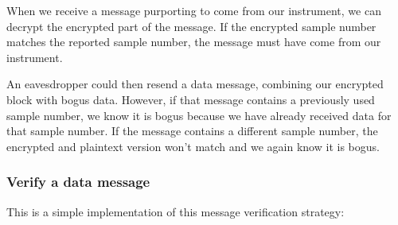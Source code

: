 When we receive a message purporting to come from our instrument, we can decrypt the encrypted part of the message.
If the encrypted sample number matches the reported sample number, the message must have come from our instrument.

An eavesdropper could then resend a data message, combining our encrypted block with bogus data.
However, if that message contains a previously used sample number, we know it is bogus because we have already received data for that sample number.
If the message contains a different sample number, the encrypted and plaintext version won't match and we again know it is bogus.


\subsubsection{\howto Verify a data message}
This is a simple implementation of this message verification strategy:
